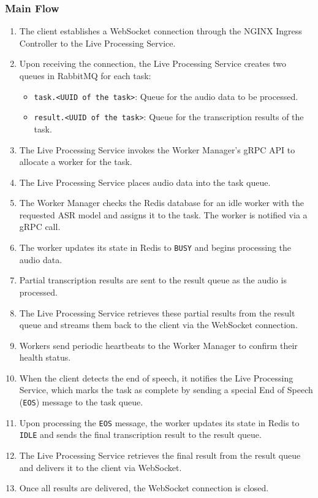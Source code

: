 \subsubsection{Main Flow}
\begin{enumerate}
    \item The client establishes a WebSocket connection through the NGINX Ingress Controller to the Live Processing Service.
    \item Upon receiving the connection, the Live Processing Service creates two queues in RabbitMQ for each task:
    \begin{itemize}
        \item \texttt{task.<UUID of the task>}: Queue for the audio data to be processed.
        \item \texttt{result.<UUID of the task>}: Queue for the transcription results of the task.
    \end{itemize} 
    \item The Live Processing Service invokes the Worker Manager’s gRPC API to allocate a worker for the task.
    \item The Live Processing Service places audio data into the task queue.
    \item The Worker Manager checks the Redis database for an idle worker with the requested ASR model and assigns it to the task. The worker is notified via a gRPC call.
    \item The worker updates its state in Redis to \texttt{BUSY} and begins processing the audio data.
    \item Partial transcription results are sent to the result queue as the audio is processed.
    \item The Live Processing Service retrieves these partial results from the result queue and streams them back to the client via the WebSocket connection.
    \item Workers send periodic heartbeats to the Worker Manager to confirm their health status.
    \item When the client detects the end of speech, it notifies the Live Processing Service, which marks the task as complete by sending a special End of Speech (\texttt{EOS}) message to the task queue.
    \item Upon processing the \texttt{EOS} message, the worker updates its state in Redis to \texttt{IDLE} and sends the final transcription result to the result queue.
    \item The Live Processing Service retrieves the final result from the result queue and delivers it to the client via WebSocket.
    \item Once all results are delivered, the WebSocket connection is closed.
\end{enumerate}

